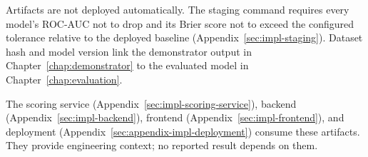 Artifacts are not deployed automatically. The staging command requires every
model's ROC-AUC not to drop and its Brier score not to exceed the configured
tolerance relative to the deployed baseline
(Appendix~\ref{sec:impl-staging}). Dataset hash and model version link the
demonstrator output in Chapter~\ref{chap:demonstrator} to the evaluated model in
Chapter~\ref{chap:evaluation}.

The scoring service (Appendix~\ref{sec:impl-scoring-service}), backend
(Appendix~\ref{sec:impl-backend}), frontend
(Appendix~\ref{sec:impl-frontend}), and deployment
(Appendix~\ref{sec:appendix-impl-deployment}) consume these artifacts. They
provide engineering context; no reported result depends on them.

